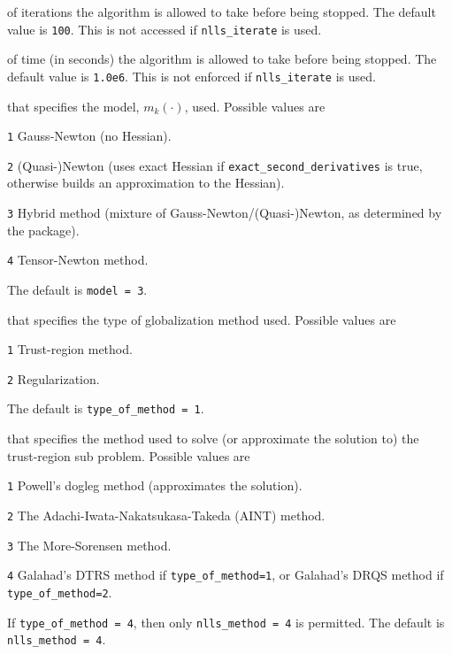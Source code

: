 \begin{description}

of iterations the algorithm is allowed to take before being stopped.  The default value is {\tt 100}.  This is not accessed if {\tt nlls\_iterate} is used.

of time (in seconds) the algorithm is allowed to take before being stopped.  The default value is {\tt 1.0e6}.  This is not enforced if {\tt nlls\_iterate} is used.

that specifies the model, $m_k(\cdot)$, used.  Possible values are
\begin{description}
  \item{\tt 1} Gauss-Newton (no Hessian).
  \item{\tt 2} (Quasi-)Newton (uses exact Hessian if {\tt exact\_second\_derivatives} is true, otherwise builds an approximation to the Hessian).
  \item{\tt 3} Hybrid method (mixture of Gauss-Newton/(Quasi-)Newton, as determined by the package).
  \item{\tt 4} Tensor-Newton method.
\end{description}
The default is {\tt model = 3}.

that specifies the type of globalization method used.  Possible values are
\begin{description}
  \item{\tt 1} Trust-region method.
  \item{\tt 2} Regularization.
\end{description}
The default is {\tt type\_of\_method = 1}.

that specifies the method used to solve (or approximate the solution to) the trust-region sub problem.  Possible values are
\begin{description}
  \item{\tt 1} Powell's dogleg method (approximates the solution).
  \item{\tt 2} The Adachi-Iwata-Nakatsukasa-Takeda (AINT) method.
  \item{\tt 3} The More-Sorensen method.
  \item{\tt 4} {\sc Galahad}'s {\sc DTRS} method if {\tt type\_of\_method=1}, or {\sc Galahad}'s {\sc DRQS} method if {\tt type\_of\_method=2}.
\end{description}
If {\tt type\_of\_method = 4}, then only {\tt nlls\_method = 4} is permitted.
The default is {\tt nlls\_method = 4}.


\end{description}
